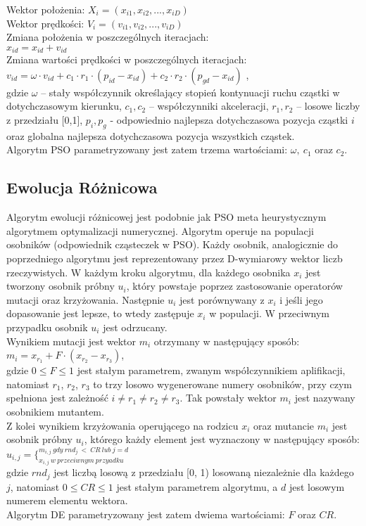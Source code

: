 \documentclass{article}
\begin{document}
 Wektor położenia: $X_i=(x_{i1},x_{i2},...,x_{iD})$\\
 Wektor prędkości: $V_i=(v_{i1},v_{i2},...,v_{iD})$\\
 Zmiana położenia w poszczególnych iteracjach: \\ \indent $x_{id} = x_{id} + v_{id}$\\
Zmiana wartości prędkości w poszczególnych iteracjach: \\ \indent $v_{id}=\omega \cdot v_{id}+c_1 \cdot r_1 \cdot(p_{id} - x_{id}) + c_2\cdot r_2\cdot (p_{gd} - x_{id})$ ,\\gdzie $\omega$ – stały współczynnik określający stopień kontynuacji ruchu cząstki w dotychczasowym kierunku, $c_1, c_2$ – współczynniki akceleracji, $r_1, r_2$ – losowe liczby z przedziału [0,1], $p_i, p_g$ - odpowiednio najlepsza dotychczasowa pozycja cząstki $i$ oraz globalna najlepsza dotychczasowa pozycja wszystkich cząstek.\\
Algorytm PSO parametryzowany jest zatem trzema wartościami: $\omega,\ c_1$ oraz $ c_2 $.
 
\subsection{Ewolucja Różnicowa}
Algorytm ewolucji różnicowej jest podobnie jak PSO meta heurystycznym algorytmem optymalizacji numerycznej. Algorytm operuje na populacji osobników (odpowiednik cząsteczek w PSO). Każdy osobnik, analogicznie do poprzedniego algorytmu jest reprezentowany przez D-wymiarowy wektor liczb rzeczywistych. W każdym kroku algorytmu, dla każdego osobnika $x_i$ jest tworzony osobnik próbny $u_i$, który powstaje poprzez zastosowanie operatorów mutacji oraz krzyżowania. Następnie $u_i$ jest porównywany z $x_i$ i jeśli jego dopasowanie jest lepsze, to wtedy zastępuje $x_i$ w populacji. W przeciwnym przypadku osobnik $u_i$ jest odrzucany.\\
Wynikiem mutacji jest wektor $m_i$ otrzymany w następujący sposób:\\
\indent $m_i = x_{r_1} + F\cdot (x_{r_2} - x_{r_3})$,\\
gdzie $0 \leq F \leq 1$ jest stałym parametrem, zwanym współczynnikiem aplifikacji, natomiast $r_1$, $r_2$, $r_3$ to trzy losowo wygenerowane numery osobników, przy czym spełniona jest zależność $i \neq r_1 \neq r_2 \neq r_3$. Tak powstały wektor $m_i$ jest nazywany osobnikiem mutantem.\\
Z kolei wynikiem krzyżowania operującego na rodzicu $x_i$ oraz mutancie $m_i$ jest osobnik próbny $u_i$, którego każdy element jest wyznaczony w następujący sposób:\\
\indent $u_{i,j} = \{ ^{m_{i,j}\  gdy\ rnd_j\ <\ CR\ lub\ j = d} _{x_{i,j}\ w\ przeciwnym\ przyadku} $\\
gdzie $rnd_j$ jest liczbą losową z przedziału [0, 1) losowaną niezależnie dla każdego $j$, natomiast  $0 \leq CR \leq 1$ jest stałym parametrem algorytmu, a $d$ jest losowym numerem elementu wektora.\\
Algorytm DE parametryzowany jest zatem dwiema wartościami: $F$ oraz $CR$. 
\end{document}
